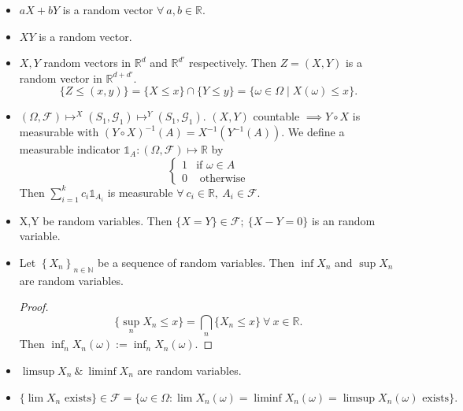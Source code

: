 \documentclass{article}
\newcommand{\1}{\mathds{1}}
\newcommand{\R}{\mathbb{R}}
\newcommand{\N}{\mathbb{N}}
\newcommand{\F}{\mathcal{F}}
\newcommand{\G}{\mathcal{G}}
\newcommand{\lf}{\left}
\newcommand{\rg}{\right}
\newcommand{\en}[3]{\lf\{{#1}_{#2}\rg\}_{#2\in #3}}
\begin{document}
\begin{itemize}
    \item $aX+bY$ is a random vector $\forall\ a,b\in\R$.
    \item $XY$ is a random vector.
    \item $X,Y$ random vectors in $\R^d$ and $\R^{d'}$ respectively. Then $Z=(X,Y)$ is a random vector in $\R^{d+d'}.$ $$\{Z\leq (x,y)\}=\{X\leq x\}\cap \{Y\leq y\}=\{\omega\in\Omega\mid X(\omega)\leq x\}.$$
    \item $(\Omega,\F)\mapsto^X(S_1,\G_1)\mapsto^Y (S_1,\G_1).$ $(X,Y)$ countable $\implies Y\circ X$ is measurable with $(Y\circ X)^{-1}(A)=X^{-1}(Y^{-1}(A)).$ We define a measurable indicator $\1_A:(\Omega,\F)\mapsto \R$ by $$\begin{cases}
       1 & \text{if } \omega\in A\\
       0 & \text{ otherwise}
    \end{cases}$$ Then $\sum_{i=1}^k c_i\1_{A_i}$ is measurable $\forall\ c_i\in\R,\ A_i\in\F.$
    \item X,Y be random variables. Then $\{X=Y\}\in\F;\ \{X-Y=0\}$ is an random variable. 
    \item Let $\en Xn\N$ be a sequence of random variables. Then $\inf X_n$ and $\sup X_n$ are random variables.
    \begin{proof}
        $$\{\sup_n X_n\leq x\}=\bigcap_n \{X_n\leq x\}\ \forall\ x\in\R.$$ Then $\inf_n X_n(\omega):=\inf_n X_n(\omega).$
    \end{proof}
    \item $\limsup X_n\ \&\ \liminf X_n$ are random variables.
    \item $\{\lim X_n\text{ exists}\}\in\F=\{\omega\in\Omega:\lim X_n(\omega)=\liminf X_n(\omega)=\limsup X_n(\omega)\text{ exists}\}.$
    \end{itemize}
\end{document}
